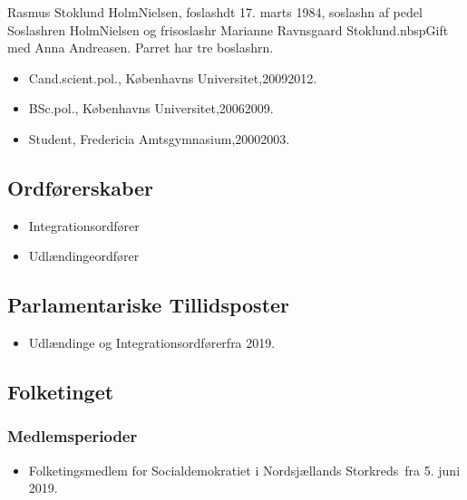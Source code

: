 \documentclass[11pt, a4paper]{awesome-cv}
\begin{document}
\makecvheader[R]
\makelettertitle
\begin{cvletter}
Rasmus Stoklund HolmNielsen, foslashdt 17. marts 1984, soslashn af pedel Soslashren HolmNielsen og frisoslashr Marianne Ravnsgaard Stoklund.nbspGift med Anna Andreasen. Parret har tre boslashrn.

\begin{itemize}
\item Cand.scient.pol., Københavns Universitet,20092012.
\item BSc.pol., Københavns Universitet,20062009.
\item Student, Fredericia Amtsgymnasium,20002003.
\end{itemize}
\subsection*{Ordførerskaber}
\begin{itemize}
\item Integrationsordfører
\item Udlændingeordfører
\end{itemize}
\subsection*{Parlamentariske Tillidsposter}
\begin{itemize}
\item Udlændinge og Integrationsordførerfra 2019.
\end{itemize}
\subsection*{Folketinget}
\subsubsection*{Medlemsperioder}
\begin{itemize}
\item Folketingsmedlem for Socialdemokratiet i Nordsjællands Storkreds fra 5. juni 2019.
\end{itemize}

\end{cvletter}
\end{document}
